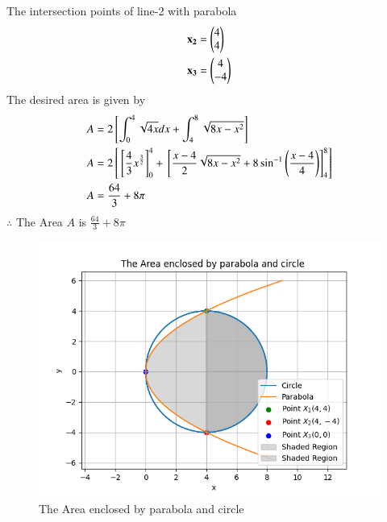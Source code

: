 \documentclass[journal]{IEEEtran}
\begin{document}
The intersection points of line-2 with parabola 
\begin{align}
\mathbf{x_2} &= \begin{pmatrix}4\\4\end{pmatrix}\\
\mathbf{x_3} &= \begin{pmatrix}4\\-4\end{pmatrix}
\end{align}
The desired area is given by 
\begin{align}
    A &= 2{}\left[\int_{0}^{4}\sqrt{4x}dx + \int_{4}^{8}\sqrt{8x - x^2} \right] \\
    A &= 2{}\left[{}\left[\frac{4}{3} x^{\frac{3}{2}}\right]_{0}^{4} + {}\left[\frac{x-4}{2}\sqrt{8x - x^2} + 8 \sin^{-1}\left(\frac{x-4}{4}\right)\right]_4^8 \right]\\
     A &= \frac{64}{3}+ 8 \pi
\end{align}
$\therefore$ The Area $A$ is $\frac{64}{3} + 8\pi$
\begin{figure}[h!]
   \centering
   \includegraphics[width = .7\linewidth]{figs/fig.png}
   \caption{The Area enclosed by parabola and circle}
   \label{stemplot}
   \end{figure}
\end{document}
